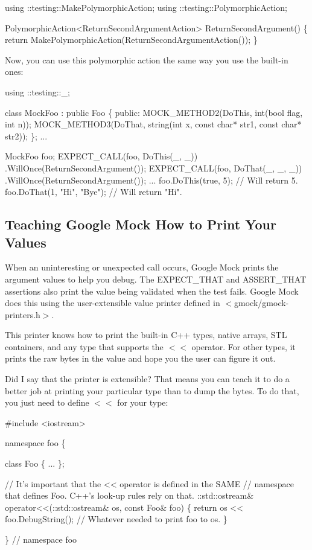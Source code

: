 \begin{DoxyCode}
using ::testing::MakePolymorphicAction;
using ::testing::PolymorphicAction;

PolymorphicAction<ReturnSecondArgumentAction> ReturnSecondArgument() \{
  return MakePolymorphicAction(ReturnSecondArgumentAction());
\}
\end{DoxyCode}


Now, you can use this polymorphic action the same way you use the built-\/in ones\+:


\begin{DoxyCode}
using ::testing::\_;

class MockFoo : public Foo \{
 public:
  MOCK\_METHOD2(DoThis, int(bool flag, int n));
  MOCK\_METHOD3(DoThat, string(int x, const char* str1, const char* str2));
\};
...

  MockFoo foo;
  EXPECT\_CALL(foo, DoThis(\_, \_))
      .WillOnce(ReturnSecondArgument());
  EXPECT\_CALL(foo, DoThat(\_, \_, \_))
      .WillOnce(ReturnSecondArgument());
  ...
  foo.DoThis(true, 5);         // Will return 5.
  foo.DoThat(1, "Hi", "Bye");  // Will return "Hi".
\end{DoxyCode}


\subsection*{Teaching Google Mock How to Print Your Values}

When an uninteresting or unexpected call occurs, Google Mock prints the argument values to help you debug. The {\ttfamily E\+X\+P\+E\+C\+T\+\_\+\+T\+H\+AT} and {\ttfamily A\+S\+S\+E\+R\+T\+\_\+\+T\+H\+AT} assertions also print the value being validated when the test fails. Google Mock does this using the user-\/extensible value printer defined in {\ttfamily $<$gmock/gmock-\/printers.\+h$>$}.

This printer knows how to print the built-\/in C++ types, native arrays, S\+TL containers, and any type that supports the {\ttfamily $<$$<$} operator. For other types, it prints the raw bytes in the value and hope you the user can figure it out.

Did I say that the printer is {\ttfamily extensible}? That means you can teach it to do a better job at printing your particular type than to dump the bytes. To do that, you just need to define {\ttfamily $<$$<$} for your type\+:


\begin{DoxyCode}
#include <iostream>

namespace foo \{

class Foo \{ ... \};

// It's important that the << operator is defined in the SAME
// namespace that defines Foo.  C++'s look-up rules rely on that.
::std::ostream& operator<<(::std::ostream& os, const Foo& foo) \{
  return os << foo.DebugString();  // Whatever needed to print foo to os.
\}

\}  // namespace foo
\end{DoxyCode}


